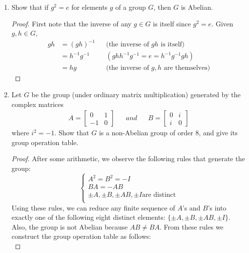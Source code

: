 \documentclass{article}
\begin{document}
\begin{enumerate}
  \item Show that if $g^2=e$ for elements $g$ of a group $G$, then $G$ is
    Abelian.
    \begin{proof}
      First note that the inverse of any $g\in G$ is itself since $g^2=e$.
      Given $g,h\in G$,
      \begin{align*}
        gh  & = (gh)^{-1}     && \text{(the inverse of $gh$ is itself)} \\
            & = h^{-1}g^{-1}  && (ghh^{-1}g^{-1}=e=h^{-1}g^{-1}gh) \\
            & = hg            && \text{(the inverse of $g,h$ are themselves)}
      \end{align*}
    \end{proof}

  \item Let $G$ be the group (under ordinary matrix multiplication)
    generated by the complex matrices \label{part_3}
    \begin{align*}
      A =
        \begin{bmatrix}
          0   & 1 \\
          -1  & 0
        \end{bmatrix}
        && and &&
      B =
        \begin{bmatrix}
          0   & i \\
          i   & 0
        \end{bmatrix}
    \end{align*}
    where $i^2=-1$. Show that $G$ is a non-Abelian group of order 8, and
    give its group operation table.
    \begin{proof}
      After some arithmetic, we observe the following rules that generate
      the group:
      \begin{equation} \label{eqn:G}
        \begin{cases}
          A^2=B^2=-I \\
          BA=-AB \\
          \pm A, \pm B, \pm AB, \pm I \text{are distinct} \\
        \end{cases}
      \end{equation}
      Using these rules, we can reduce any finite sequence of $A$'s and
      $B$'s into exactly one of the following eight distinct elements:
      $\{\pm A, \pm B, \pm AB, \pm I\}$. Also, the group is not Abelian
      because $AB\neq BA$. From these rules we construct the group
      operation table as follows: \\

\end{proof}
\end{enumerate}
\end{document}
